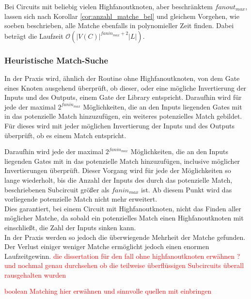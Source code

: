 \documentclass[11pt, a4paper, german]{article}
\begin{document}
Bei Circuits mit beliebig vielen Highfanoutknoten, aber beschränktem $fanout_{max}$, lassen sich nach Korollar \ref{cor:anzahl_matche_bel} und gleichem Vorgehen, wie soeben beschrieben, alle Matche ebenfalls in polynomieller Zeit finden. Dabei beträgt die Laufzeit $\mathcal{O}(|V(C)|^{fanin_{max}+2}|L|)$.

\subsubsection{Heuristische Match-Suche}
In der Praxis wird, ähnlich der Routine ohne Highfanoutknoten, von dem Gate eines Knoten ausgehend überprüft, ob dieser, oder eine mögliche Invertierung der Inputs und des Outputs, einem Gate der Library entspricht. 
Daraufhin wird für jede der maximal $2^{fanin_{max}}$ Möglichkeiten, die an den Inputs liegenden Gates mit in das potenzielle Match hinzuzufügen, ein weiteres potenzielles Match gebildet. Für dieses wird mit jeder möglichen Invertierung der Inputs und des Outputs überprüft, ob es einem Match entspricht.

Daraufhin wird jede der maximal $2^{fanin_{max}}$ Möglichkeiten, die an den Inputs liegenden Gates mit in das potenzielle Match hinzuzufügen, inclusive möglicher Invertierungen überprüft. Dieser Vorgang wird für jede der Möglichkeiten so lange wiederholt, bis die Anzahl der Inputs des durch das potenzielle Match,  beschriebenen Subcircuit größer als $fanin_{max}$ ist. Ab diesem Punkt wird das vorliegende potenzielle Match nicht mehr erweitert. \\
Dies garantiert, bei einem Circuit mit Highfanoutknoten, nicht das Finden aller möglicher Matche, da sobald ein potenzielles Match einen Highfanoutknoten mit einschließt, die Zahl der Inputs sinken kann. \\
In der Praxis werden so jedoch die überwiegende Mehrheit der Matche gefunden. Der Verlust einiger weniger Matche ermöglicht jedoch einen enormen Laufzeitgewinn.
\textcolor{red}{die dissertation für den fall ohne highfanoutknoten erwähnen ? und nochmal genau durchsehen ob die teilweise überflüssigen Subcircuits überall rausgehalten wurden }

\textcolor{red}{boolean Matching hier erwähnen und sinnvolle quellen mit einbringen}
\end{document}
